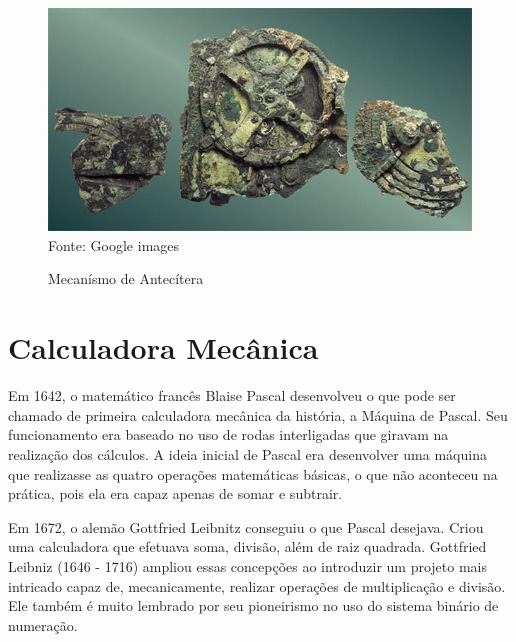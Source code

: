 \documentclass[
	12pt,				%
	openright,			%
	twoside,			%
	a4paper,			%
	english,			%
	french,				%
	spanish,			%
	brazil,				%
	]{abntex2}
\begin{document}
\begin{figure}[htb]
	\begin{center}
	\caption{\label{fig_teste}Mecanísmo de Antecítera}
	\includegraphics[scale=0.5]{img/mecanismoAnticitera2.jpg} \\
	Fonte: Google images
	\end{center}
\end{figure}


\chapter{Calculadora Mecânica}

Em 1642, o matemático francês Blaise Pascal desenvolveu o que pode ser chamado de primeira calculadora mecânica da história, a Máquina de Pascal. Seu funcionamento era baseado no uso de rodas interligadas que giravam na realização dos cálculos. A ideia inicial de Pascal era desenvolver uma máquina que realizasse as quatro operações matemáticas básicas, o que não aconteceu na prática, pois ela era capaz apenas de somar e subtrair.
\par
Em 1672, o alemão Gottfried Leibnitz conseguiu o que Pascal desejava. Criou uma calculadora que efetuava soma, divisão, além de raiz quadrada. Gottfried Leibniz (1646 - 1716) ampliou essas concepções ao introduzir um projeto mais intricado capaz de, mecanicamente, realizar operações de multiplicação e divisão. Ele também é muito lembrado por seu pioneirismo no uso do sistema binário de numeração.

\end{document}
